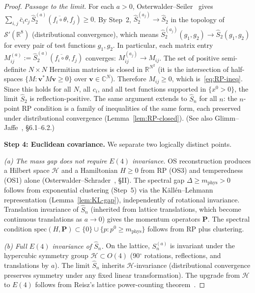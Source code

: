 \documentclass[11pt]{article}
\theoremstyle{definition}
\newcommand{\R}{\mathbb{R}}
\begin{document}
\begin{proof}
\emph{Passage to the limit.}
For each $a>0$, Osterwalder--Seiler~\cite{OS78} gives
$\sum_{i,j}\bar c_i c_j\,
\hat S_2^{(a)}(\overline{f_i\circ\theta},f_j)\ge 0$.
By Step~2, $\hat S_2^{(a_j)}\to\hat S_2$ in the
topology of $\mathcal{S}'(\R^8)$
(distributional convergence), which means
$\hat S_2^{(a_j)}(g_1,g_2)\to\hat S_2(g_1,g_2)$
for every pair of test functions $g_1,g_2$.
In particular, each matrix entry
$M_{ij}^{(a)}:=\hat S_2^{(a)}
(\overline{f_i\circ\theta},f_j)$
converges: $M_{ij}^{(a_j)}\to M_{ij}$.
The set of positive semi-definite $N\times N$
Hermitian matrices is closed in $\R^{N^2}$
(it is the intersection of half-spaces
$\{M:\mathbf{v}^*M\mathbf{v}\ge 0\}$ over
$\mathbf{v}\in\mathbb{C}^N$).
Therefore $M_{ij}\ge 0$, which is~\eqref{eq:RP-ineq}.
Since this holds for all $N$, all $c_i$, and all test
functions supported in $\{x^0>0\}$, the limit
$\hat S_2$ is reflection-positive.
The same argument extends to $\hat S_n$ for all $n$:
the $n$-point RP condition is a family of inequalities
of the same form, each preserved under distributional
convergence (Lemma~\ref{lem:RP-closed}).
(See also Glimm--Jaffe~\cite{GlimmJaffe}, \S6.1--6.2.)

\textbf{Step 4: Euclidean covariance.}
We separate two logically distinct points.

\emph{(a) The mass gap does not require $E(4)$ invariance.}
OS reconstruction produces a Hilbert space $\mathcal{H}$
and a Hamiltonian $H\ge 0$ from RP (OS3) and temperedness
(OS1) alone (Osterwalder--Schrader~\cite{OS73}, \S II).
The spectral gap $\Delta\ge m_{\mathrm{phys}}>0$ follows
from exponential clustering (Step~5) via the
K\"all\'en--Lehmann representation
(Lemma~\ref{lem:KL-gap}), independently of rotational
invariance.  Translation invariance of $\hat S_n$
(inherited from lattice translations, which become
continuous translations as $a\to 0$) gives the
momentum operators $\mathbf{P}$.  The spectral
condition $\mathrm{spec}(H,\mathbf{P})\subset
\{0\}\cup\{p:p^0\ge m_{\mathrm{phys}}\}$ follows
from RP plus clustering.

\emph{(b) Full $E(4)$ invariance of $\hat S_n$.}
On the lattice, $S_n^{(a)}$ is invariant under the
hypercubic symmetry group $\mathcal{H}\subset O(4)$
(90$^\circ$ rotations, reflections, and translations by $a$).
The limit $\hat S_n$ inherits $\mathcal{H}$-invariance
(distributional convergence preserves symmetry under any
fixed linear transformation).
The upgrade from $\mathcal{H}$ to $E(4)$ follows from
Reisz's lattice power-counting
theorem~\cite{Reisz1988,Reisz89}.


\end{proof}
\end{document}
